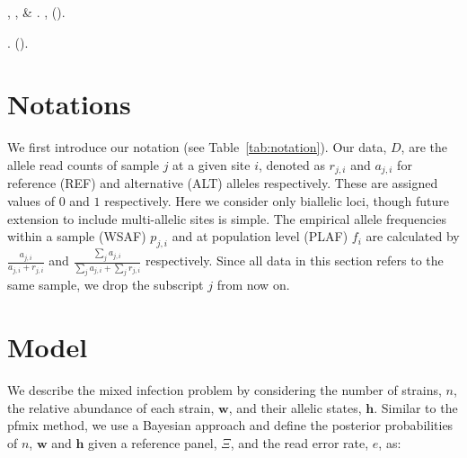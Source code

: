 \documentclass{nature}
\newcounter{firstbib}
\begin{document}
\begin{thebibliography}{10}
, ,
   \& 
\newblock {}.
\newblock \emph{} \textbf{},
   ().

\newblock {}.
\newblock \emph{}  ().

\setcounter{firstbib}{\value{enumiv}}

\end{thebibliography}




\newpage

\section*{Notations}

We first introduce our notation (see Table~\ref{tab:notation}). Our data, $D$, are the allele read counts of sample $j$ at a given site $i$, denoted as $r_{j,i}$ and $a_{j,i}$ for reference (REF) and alternative (ALT) alleles respectively.  These are assigned values of $0$ and $1$ respectively. Here we consider only biallelic loci, though future extension to include multi-allelic sites is simple.  The empirical allele frequencies within a sample (WSAF) $p_{j,i}$ and at population level (PLAF) $f_i$ are calculated by $ \frac{a_{j,i}}{a_{j,i} + r_{j,i}}$ and $ \frac{\sum_j a_{j,i}}{\sum_j a_{j,i} + \sum_j r_{j,i}}$ respectively. Since all data in this section refers to the same sample, we drop the subscript $j$ from now on.


\section*{Model}

We describe the mixed infection problem by considering the number of strains, $n$, the relative abundance of each strain, $\mathbf{w}$, and their allelic states, $\mathbf{h}$. Similar to the pfmix method\cite{Jack2016}, we use a Bayesian approach and define the posterior probabilities of $n$, $\mathbf{w}$ and $\mathbf{h}$ given a reference panel, $\Xi$, and the read error rate, $e$, as:
\end{document}

